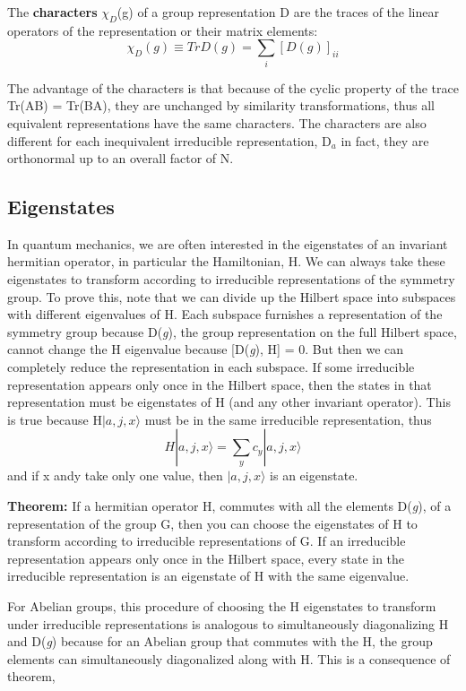 The \textbf{characters} $\chi_D$(g) of a group representation D are the traces of the linear
operators of the representation or their matrix elements:
\begin{equation}
    \chi_D(g) \equiv Tr D(g) = \sum_{i}[D(g)]_{ii}
\end{equation}

The advantage of the characters is that because of the cyclic property of the trace Tr(AB) = Tr(BA), they are unchanged by similarity transformations,
thus all equivalent representations have the same characters. The characters are also different for each inequivalent irreducible representation, D$_a$\textemdash 
in fact, they are orthonormal up to an overall factor of N.

\subsection{Eigenstates}
In quantum mechanics, we are often interested in the eigenstates of an invariant hermitian operator, in particular the Hamiltonian, H. 
We can always take these eigenstates to transform according to irreducible representations of the symmetry group. 
To prove this, note that we can divide up the Hilbert space into subspaces with different eigenvalues of H. 
Each subspace furnishes a representation of the symmetry group because D(\textit{g}), the group representation on the full Hilbert space, 
cannot change the H eigenvalue because [D(\textit{g}), H] = 0. But then we can completely reduce the representation in each subspace.
If some irreducible representation appears only once in the Hilbert space, then the states in that representation must be eigenstates
of H (and any other invariant operator). This is true because H$|a, j, x\rangle$ must be in the same irreducible representation, thus
\begin{equation}
    H|a, j, x\rangle = \sum_{y} c_y |a, j, x\rangle
\end{equation}
and if x andy take only one value, then $|a, j, x\rangle$ is an eigenstate.

\textbf{Theorem:} If a hermitian operator H, commutes with all the elements D(\textit{g}), of a representation of the group G, 
then you can choose the eigenstates of H to transform according to irreducible representations of G. 
If an irreducible representation appears only once in the Hilbert space, every state in the irreducible representation 
is an eigenstate of H with the same eigenvalue.

For Abelian groups, this procedure of choosing the H eigenstates to transform under irreducible representations is analogous to simultaneously 
diagonalizing H and D(\textit{g}) because for an Abelian group that commutes with the H, the group elements can simultaneously
diagonalized along with H. This is a consequence of theorem,

